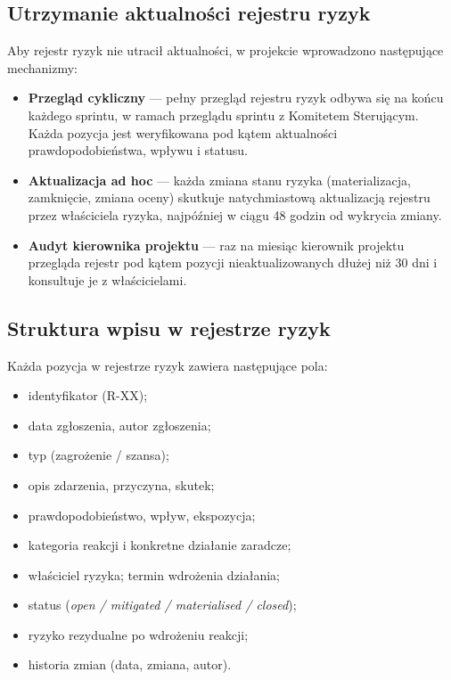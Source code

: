 \documentclass[11pt,a4paper]{article}
\begin{document}
	\subsection{Utrzymanie aktualności rejestru ryzyk}
	Aby rejestr ryzyk nie utracił aktualności, w projekcie wprowadzono następujące mechanizmy:
	\begin{itemize}[noitemsep]
		\item \textbf{Przegląd cykliczny} --- pełny przegląd rejestru ryzyk odbywa się na końcu każdego sprintu, w ramach przeglądu sprintu z Komitetem Sterującym. Każda pozycja jest weryfikowana pod kątem aktualności prawdopodobieństwa, wpływu i statusu.
		\item \textbf{Aktualizacja ad hoc} --- każda zmiana stanu ryzyka (materializacja, zamknięcie, zmiana oceny) skutkuje natychmiastową aktualizacją rejestru przez właściciela ryzyka, najpóźniej w ciągu 48 godzin od wykrycia zmiany.
		\item \textbf{Audyt kierownika projektu} --- raz na miesiąc kierownik projektu przegląda rejestr pod kątem pozycji nieaktualizowanych dłużej niż 30 dni i konsultuje je z właścicielami.
	\end{itemize}
	
	\subsection{Struktura wpisu w rejestrze ryzyk}
	Każda pozycja w rejestrze ryzyk zawiera następujące pola:
	\begin{itemize}[noitemsep]
		\item identyfikator (R-XX);
		\item data zgłoszenia, autor zgłoszenia;
		\item typ (zagrożenie / szansa);
		\item opis zdarzenia, przyczyna, skutek;
		\item prawdopodobieństwo, wpływ, ekspozycja;
		\item kategoria reakcji i konkretne działanie zaradcze;
		\item właściciel ryzyka; termin wdrożenia działania;
		\item status (\textit{open / mitigated / materialised / closed});
		\item ryzyko rezydualne po wdrożeniu reakcji;
		\item historia zmian (data, zmiana, autor).
	\end{itemize}
	
\end{document}
